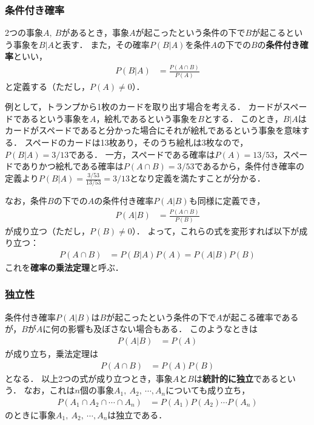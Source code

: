 \subsubsection*{条件付き確率}
%
2つの事象$ A,\ B $があるとき，事象$ A $が起こったという条件の下で$ B $が起こるという事象を$ B|A $と表す．
%
また，その確率$ P(B|A) $を条件$ A $の下での$ B $の\textbf{条件付き確率}といい，
%
\begin{align*}
	P(B|A) &= \frac{P(A\cap B)}{P(A)}
\end{align*}
%
と定義する（ただし，$ P(A)\neq 0 $）．
%

%
例として，トランプから1枚のカードを取り出す場合を考える．
%
カードがスペードであるという事象を$ A $，絵札であるという事象を$ B $とする．
%
このとき，$ B|A $はカードがスペードであると分かった場合にそれが絵札であるという事象を意味する．
%
スペードのカードは13枚あり，そのうち絵札は3枚なので，$ P(B|A)=3/13 $である．
%
一方，スペードである確率は$ P(A)=13/53 $，スペードでありかつ絵札である確率は$ P(A\cap B)=3/53 $であるから，条件付き確率の定義より$ P(B|A)=\frac{3/53}{13/53}=3/13 $となり定義を満たすことが分かる．
%

\vspace{0.5cm}
%
なお，条件$ B $の下での$ A $の条件付き確率$ P(A|B) $も同様に定義でき，
%
\begin{align*}
	P(A|B) &= \frac{P(A\cap B)}{P(B)}
\end{align*}
%
が成り立つ（ただし，$ P(B)\neq 0 $）．
%
よって，これらの式を変形すれば以下が成り立つ：
%
\begin{align*}
	P(A\cap B) &= P(B|A)P(A) = P(A|B)P(B)
\end{align*}
%
これを\textbf{確率の乗法定理}と呼ぶ．
%

\subsubsection*{独立性}
%
条件付き確率$ P(A|B) $は$ B $が起こったという条件の下で$ A $が起こる確率であるが，$ B $が$ A $に何の影響も及ぼさない場合もある．
%
このようなときは
%
\begin{align*}
	P(A|B) &= P(A)
\end{align*}
%
が成り立ち，乗法定理は
%
\begin{align*}
	P(A\cap B) &= P(A)P(B)
\end{align*}
%
となる．
%
以上2つの式が成り立つとき，事象$ A $と$ B $は\textbf{統計的に独立}であるという．
%
なお，これは$ n $個の事象$ A_{1},\ A_{2},\ \cdots, A_{n} $についても成り立ち，
%
\begin{align*}
	P(A_{1}\cap A_{2}\cap \cdots \cap A_{n}) &= P(A_{1})P(A_{2})\cdots P(A_{n})
\end{align*}
%
のときに事象$ A_{1},\ A_{2},\ \cdots, A_{n} $は独立である．
%

